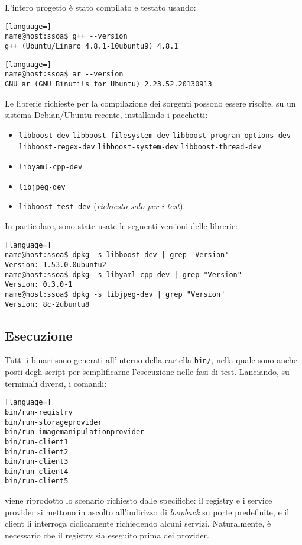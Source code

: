 \documentclass[a4paper,twoside]{article}
\newcommand*\file{\texttt}
\begin{document}
L'intero progetto è stato compilato e testato usando:
\begin{lstlisting}[language=]
name@host:ssoa$ g++ --version 
g++ (Ubuntu/Linaro 4.8.1-10ubuntu9) 4.8.1
\end{lstlisting}

\begin{lstlisting}[language=]
name@host:ssoa$ ar --version 
GNU ar (GNU Binutils for Ubuntu) 2.23.52.20130913
\end{lstlisting}

Le librerie richieste per la compilazione dei sorgenti possono essere risolte, su un sistema Debian/Ubuntu recente, installando i pacchetti:
\begin{itemize}
\item \file{libboost-dev} \file{libboost-filesystem-dev} \file{libboost-program-options-dev} \file{libboost-regex-dev} \file{libboost-system-dev} \file{libboost-thread-dev}
\item \file{libyaml-cpp-dev}
\item \file{libjpeg-dev}
\item \file{libboost-test-dev} (\emph{richiesto solo per i test}).
\end{itemize}

In particolare, sono state usate le seguenti versioni delle librerie:
\begin{lstlisting}[language=]
name@host:ssoa$ dpkg -s libboost-dev | grep 'Version'
Version: 1.53.0.0ubuntu2
name@host:ssoa$ dpkg -s libyaml-cpp-dev | grep "Version"
Version: 0.3.0-1
name@host:ssoa$ dpkg -s libjpeg-dev | grep "Version"
Version: 8c-2ubuntu8
\end{lstlisting}



\subsection{Esecuzione}

Tutti i binari sono generati all'interno della cartella \file{bin/}, nella quale sono anche posti degli script per semplificarne l'esecuzione nelle fasi di test. Lanciando, su terminali diversi, i comandi:
\begin{lstlisting}[language=]
bin/run-registry
bin/run-storageprovider
bin/run-imagemanipulationprovider
bin/run-client1
bin/run-client2
bin/run-client3
bin/run-client4
bin/run-client5
\end{lstlisting}
viene riprodotto lo scenario richiesto dalle specifiche: il registry e i service provider si mettono in ascolto all'indirizzo di \emph{loopback} su porte predefinite, e il client li interroga ciclicamente richiedendo alcuni servizi. Naturalmente, è necessario che il registry sia eseguito prima dei provider.
\end{document}
